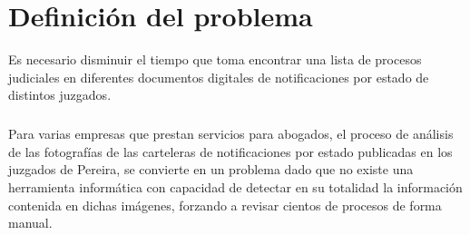 \chapter{Definici\'on del problema}
\label{sec:definicion}
Es necesario disminuir el tiempo que toma encontrar una lista de
procesos judiciales en diferentes documentos digitales de notificaciones
por estado de distintos juzgados.
\paragraph{}
Para varias empresas que prestan servicios para abogados, el proceso 
de an\'alisis de las fotograf\'ias de las carteleras de notificaciones por 
estado publicadas en los juzgados de Pereira, se convierte en un problema 
dado que no existe una herramienta inform\'atica con capacidad de detectar 
en su totalidad la informaci\'on contenida en dichas im\'agenes, forzando a
revisar cientos de procesos de forma manual. 
\pagebreak